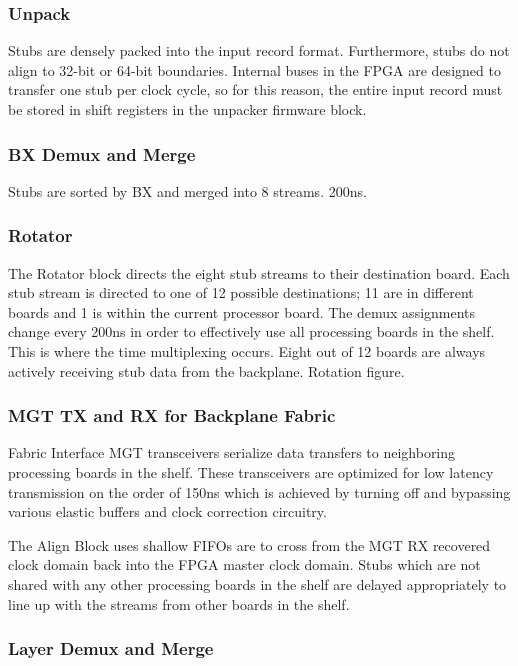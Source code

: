 \documentclass[letterpaper]{article}
\begin{document}
\subsubsection{Unpack}

Stubs are densely packed into the input record format.  Furthermore, stubs do not align to 32-bit or 64-bit boundaries.  Internal buses in the FPGA are designed to transfer one stub per clock cycle, so for this reason, the entire input record must be stored in shift registers in the unpacker firmware block.

\subsubsection{BX Demux and Merge}

Stubs are sorted by BX and merged into 8 streams.  200ns.

\subsubsection{Rotator}

The Rotator block directs the eight stub streams to their destination board.  Each stub stream is directed to one of 12 possible destinations; 11 are in different boards and 1 is within the current processor board.  The demux assignments change every 200ns in order to effectively use all processing boards in the shelf.  This is where the time multiplexing occurs.  Eight out of 12 boards are always actively receiving stub data from the backplane.  Rotation figure.

\subsubsection{MGT TX and RX for Backplane Fabric}

Fabric Interface MGT transceivers serialize data transfers to neighboring processing boards in the shelf.  These transceivers are optimized for low latency transmission on the order of 150ns which is achieved by turning off and bypassing various elastic buffers and clock correction circuitry.

The Align Block uses shallow FIFOs are to cross from the MGT RX recovered clock domain back into the FPGA master clock domain.  Stubs which are not shared with any other processing boards in the shelf are delayed appropriately to line up with the streams from other boards in the shelf.

\subsubsection{Layer Demux and Merge}
\end{document}
